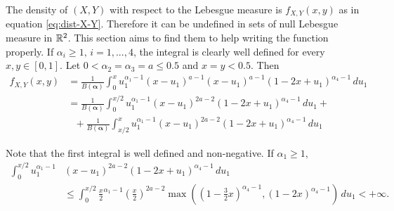 The density of $(X,Y)$ with respect to the Lebesgue measure is $f_{X,Y}(x,y)$
as in equation \eqref{eq:dist-X-Y}. Therefore it can be undefined in sets of
null Lebesgue measure in $\mathbb{R}^2$. This section
aims to find them to help writing the function properly. If $\alpha_i \ge 1,
\, i = 1,...,4$, the integral is clearly well defined for every $x,y \in [0,1]$. Let $0 < \alpha_2 = \alpha_3 = a \le 0.5$ and $x = y < 0.5$. Then
\begin{equation*}
  \begin{split}
    f_{X,Y}(x,y) &= \frac{1}{B(\boldsymbol{\alpha})}\int_{0}^x u_1^{\alpha_1-1}(x-u_1)^{a-1}(x-u_1)^{a-1}(1-2x+u_1)^{\alpha_4-1} \, du_1 \\
    &= \frac{1}{B(\boldsymbol{\alpha})}\int_{0}^{x/2} u_1^{\alpha_1-1}(x-u_1)^{2a-2}(1-2x+u_1)^{\alpha_4-1} \, du_1 + \\
    &~~~+ \frac{1}{B(\boldsymbol{\alpha})}\int_{x/2}^x u_1^{\alpha_1-1}(x-u_1)^{2a-2}(1-2x+u_1)^{\alpha_4-1} \, du_1
  \end{split}
\end{equation*}

Note that the first integral is well defined and non-negative. If $\alpha_1 \ge 1$, 
\begin{equation*}
  \begin{split}
    \int_{0}^{x/2} u_1^{\alpha_1-1}&(x-u_1)^{2a-2}(1-2x+u_1)^{\alpha_4-1} \, du_1 \\
    &\le \int_{0}^{x/2} \frac{x}{2}^{\alpha_1-1}\left(\frac{x}{2}\right)^{2a-2}\max\left(\left(1-\frac{3}{2}x\right)^{\alpha_4-1}, (1-2x)^{\alpha_4-1}\right) \, du_1 < +\infty.
  \end{split}
\end{equation*}

